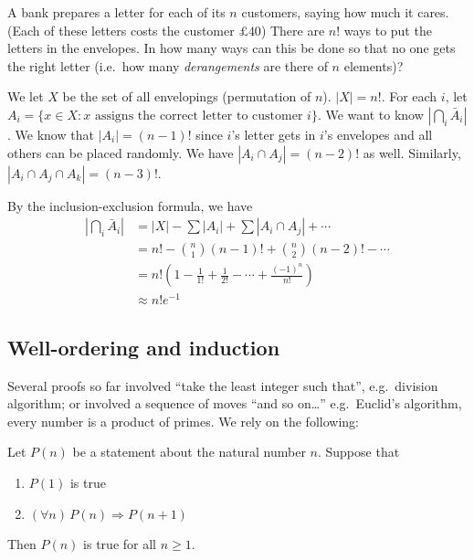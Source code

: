 \documentclass[a4paper]{article}
\begin{document}
\begin{eg}
  A bank prepares a letter for each of its $n$ customers, saying how much it cares. (Each of these letters costs the customer $\pounds 40$) There are $n!$ ways to put the letters in the envelopes. In how many ways can this be done so that no one gets the right letter (i.e.\ how many \emph{derangements} are there of $n$ elements)?

  We let $X$ be the set of all envelopings (permutation of $n$). $|X| = n!$. For each $i$, let $A_i = \{x\in X: x \text{ assigns the correct letter to customer }i\}$. We want to know $|\bigcap_i \bar A_i|$. We know that $|A_i| = (n - 1)!$ since $i$'s letter gets in $i$'s envelopes and all others can be placed randomly. We have $|A_i\cap A_j| = (n - 2)!$ as well. Similarly, $|A_i\cap A_j \cap A_k| = (n - 3)!$.

  By the inclusion-exclusion formula, we have
  \begin{align*}
    \left|\bigcap_i \bar A_i\right| &= |X| - \sum |A_i| + \sum |A_i\cap A_j| + \cdots\\
    &= n! - \binom{n}{1}(n - 1)! + \binom{n}{2}(n - 2)! - \cdots\\
    &= n!\left(1 - \frac{1}{1!} + \frac{1}{2!} - \cdots + \frac{(-1)^n}{n!}\right)\\
    &\approx n! e^{-1}
  \end{align*}
\end{eg}
\subsection{Well-ordering and induction}
Several proofs so far involved ``take the least integer such that'', e.g.\ division algorithm; or involved a sequence of moves ``and so on\ldots'' e.g.\ Euclid's algorithm, every number is a product of primes. We rely on the following:
\begin{thm}
  Let $P(n)$ be a statement about the natural number $n$. Suppose that
  \begin{enumerate}
    \item $P(1)$ is true
    \item $(\forall n)\,P(n)\Rightarrow P(n + 1)$
  \end{enumerate}
  Then $P(n)$ is true for all $n\geq 1$.
\end{thm}
\end{document}
